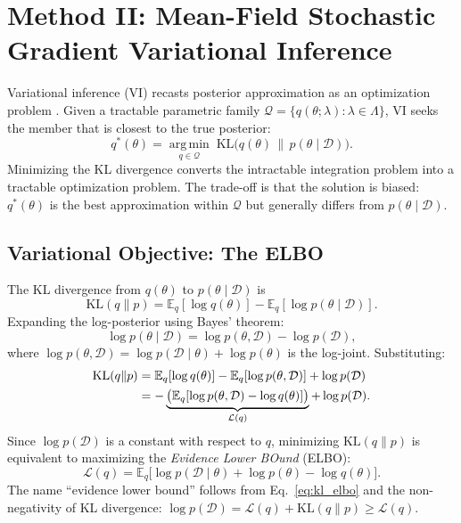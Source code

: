 \documentclass[12pt,a4paper]{article}
\newcommand{\D}{\mathcal{D}}
\newcommand{\E}{\mathbb{E}}
\newcommand{\KL}{\mathrm{KL}}
\newcommand{\ELBO}{\mathcal{L}}
\newcommand{\lam}{\lambda}
\begin{document}
\section{Method II: Mean-Field Stochastic Gradient Variational Inference}
\label{sec:vi}

Variational inference (VI) recasts posterior approximation as an optimization
problem \citep{jordan1999introduction,blei2017variational}.
Given a tractable parametric family $\mathcal{Q} = \{q(\theta;\lam) : \lam \in \Lambda\}$,
VI seeks the member that is closest to the true posterior:
\begin{equation}
  q^*(\theta) = \operatorname*{arg\,min}_{q \in \mathcal{Q}}\;
  \KL\!\bigl(q(\theta) \,\|\, p(\theta \mid \D)\bigr).
  \label{eq:vi_obj}
\end{equation}
Minimizing the KL divergence converts the intractable integration problem
into a tractable optimization problem.
The trade-off is that the solution is biased: $q^*(\theta)$ is
the best approximation within $\mathcal{Q}$ but generally differs
from $p(\theta \mid \D)$.

\subsection{Variational Objective: The ELBO}

The KL divergence from $q(\theta)$ to $p(\theta \mid \D)$ is
\begin{equation}
  \KL(q \| p) = \E_q[\log q(\theta)] - \E_q[\log p(\theta \mid \D)].
  \label{eq:kl_def}
\end{equation}
Expanding the log-posterior using Bayes' theorem:
\begin{equation}
  \log p(\theta \mid \D) = \log p(\theta, \D) - \log p(\D),
\end{equation}
where $\log p(\theta, \D) = \log p(\D \mid \theta) + \log p(\theta)$
is the log-joint.
Substituting:
\begin{align}
  \KL(q \| p)
  &= \E_q[\log q(\theta)] - \E_q[\log p(\theta, \D)] + \log p(\D) \notag \\
  &= -\underbrace{\bigl(\E_q[\log p(\theta, \D) - \log q(\theta)]\bigr)}_{\ELBO(q)}
    + \log p(\D).
  \label{eq:kl_elbo}
\end{align}
Since $\log p(\D)$ is a constant with respect to $q$, minimizing
$\KL(q \| p)$ is equivalent to maximizing the
\emph{Evidence Lower BOund} (ELBO):
\begin{equation}
  \ELBO(q)
  = \E_q\!\bigl[\log p(\D \mid \theta) + \log p(\theta) - \log q(\theta)\bigr].
  \label{eq:elbo}
\end{equation}
The name ``evidence lower bound'' follows from Eq.~\eqref{eq:kl_elbo}
and the non-negativity of KL divergence:
$\log p(\D) = \ELBO(q) + \KL(q \| p) \geq \ELBO(q)$.
\end{document}
